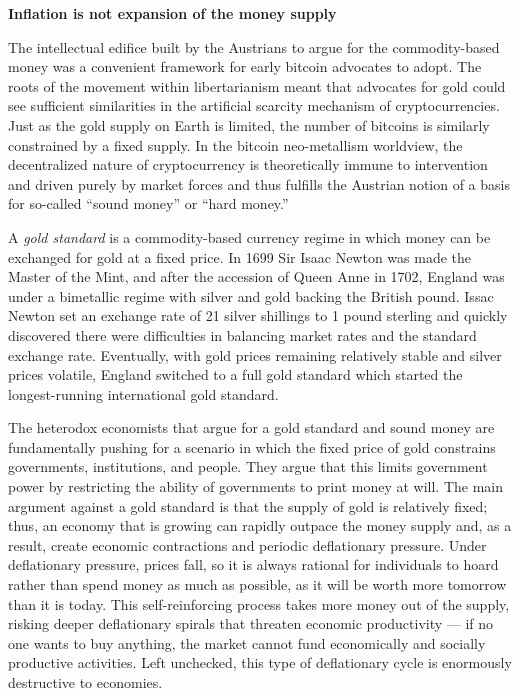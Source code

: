 \begin{infobox}
 \textbf{Inflation is not expansion of the money supply}
\end{infobox}


The intellectual edifice built by the Austrians to argue for the commodity-based
money was a convenient framework for early bitcoin advocates to adopt. The roots
of the movement within libertarianism meant that advocates for gold could see
sufficient similarities in the artificial scarcity mechanism of
cryptocurrencies. Just as the gold supply on Earth is limited, the number of
bitcoins is similarly constrained by a fixed supply. In the bitcoin
neo-metallism worldview, the decentralized nature of cryptocurrency is
theoretically immune to intervention and driven purely by market forces and thus
fulfills the Austrian notion of a basis for so-called ``sound money'' or ``hard
money.''


A \textit{gold standard} is a commodity-based currency regime in which money can
be exchanged for gold at a fixed price. In 1699 Sir Isaac Newton was made the
Master of the Mint, and after the accession of Queen Anne in 1702, England was
under a bimetallic regime with silver and gold backing the British pound. Issac
Newton set an exchange rate of 21 silver shillings to 1 pound sterling and
quickly discovered there were difficulties in balancing market rates and the
standard exchange rate. Eventually, with gold prices remaining relatively stable
and silver prices volatile, England switched to a full gold standard which
started the longest-running international gold standard.


The heterodox economists that argue for a gold standard and sound money are
fundamentally pushing for a scenario in which the fixed price of gold constrains
governments, institutions, and people. They argue that this limits government
power by restricting the ability of governments to print money at will. The main
argument against a gold standard is that the supply of gold is relatively fixed;
thus, an economy that is growing can rapidly outpace the money supply and, as a
result, create economic contractions and periodic deflationary pressure. Under
deflationary pressure, prices fall, so it is always rational for individuals to
hoard rather than spend money as much as possible, as it will be worth more
tomorrow than it is today. This self-reinforcing process takes more money out of
the supply, risking deeper deflationary spirals that threaten economic
productivity --- if no one wants to buy anything, the market cannot fund
economically and socially productive activities. Left unchecked, this type of
deflationary cycle is enormously destructive to economies.

